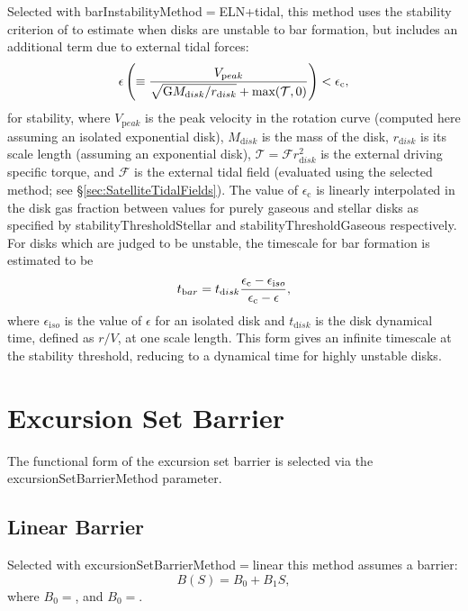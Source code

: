 Selected with {\normalfont \ttfamily barInstabilityMethod}$=${\normalfont \ttfamily ELN+tidal}, this method uses the stability criterion of \cite{efstathiou_stability_1982} to estimate when disks are unstable to bar formation, but includes an additional term due to external tidal forces:
\begin{equation}
 \epsilon \left( \equiv {V_{\mathrm peak} \over \sqrt{\G M_{\mathrm disk}/r_{\mathrm disk}} + \hbox{max}(\mathcal{T},0) } \right) < \epsilon_{\mathrm c},
\end{equation}
for stability, where $V_{\mathrm peak}$ is the peak velocity in the rotation curve (computed here assuming an isolated exponential disk), $M_{\mathrm disk}$ is the mass of the disk, $r_{\mathrm disk}$ is its scale length (assuming an exponential disk), $\mathcal{T} = \mathcal{F} r_{\mathrm disk}^2$ is the external driving specific torque, and $\mathcal{F}$ is the external tidal field (evaluated using the selected method; see \S\ref{sec:SatelliteTidalFields}). The value of $\epsilon_{\mathrm c}$ is linearly interpolated in the disk gas fraction between values for purely gaseous and stellar disks as specified by {\normalfont \ttfamily stabilityThresholdStellar} and {\normalfont \ttfamily stabilityThresholdGaseous} respectively. For disks which are judged to be unstable, the timescale for bar formation is estimated to be
\begin{equation}
 t_{\mathrm bar} = t_{\mathrm disk} {\epsilon_{\mathrm c} - \epsilon_{\mathrm iso} \over \epsilon_{\mathrm c} - \epsilon},
\end{equation}
where $\epsilon_{\mathrm iso}$ is the value of $\epsilon$ for an isolated disk and $t_{\mathrm disk}$ is the disk dynamical time, defined as $r/V$, at one scale length. This form gives an infinite timescale at the stability threshold, reducing to a dynamical time for highly unstable disks.

\section{Excursion Set Barrier}

The functional form of the excursion set barrier is selected via the {\normalfont \ttfamily excursionSetBarrierMethod} parameter.

\subsection{Linear Barrier}

Selected with {\normalfont \ttfamily excursionSetBarrierMethod}$=${\normalfont \ttfamily linear} this method assumes a barrier:
\begin{equation}
B(S) = B_0 + B_1 S,
\end{equation}
where $B_0=${\normalfont \ttfamily [excursionSetBarrierConstantCoefficient]}, and $B_0=${\normalfont \ttfamily [excursionSetBarrierLinearCoefficient]}.

